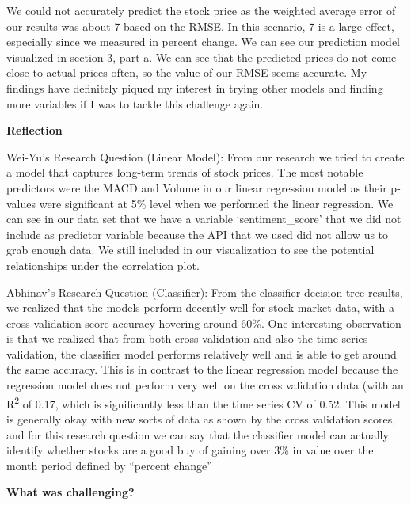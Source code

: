 \documentclass[
]{article}
\begin{document}
We could not accurately predict the stock price as the weighted average
error of our results was about 7 based on the RMSE. In this scenario, 7
is a large effect, especially since we measured in percent change. We
can see our prediction model visualized in section 3, part a. We can see
that the predicted prices do not come close to actual prices often, so
the value of our RMSE seems accurate. My findings have definitely piqued
my interest in trying other models and finding more variables if I was
to tackle this challenge again.

\textbf{Reflection}

Wei-Yu's Research Question (Linear Model): From our research we tried to
create a model that captures long-term trends of stock prices. The most
notable predictors were the MACD and Volume in our linear regression
model as their p-values were significant at 5\% level when we performed
the linear regression. We can see in our data set that we have a
variable `sentiment\_score' that we did not include as predictor
variable because the API that we used did not allow us to grab enough
data. We still included in our visualization to see the potential
relationships under the correlation plot.

Abhinav's Research Question (Classifier): From the classifier decision
tree results, we realized that the models perform decently well for
stock market data, with a cross validation score accuracy hovering
around 60\%. One interesting observation is that we realized that from
both cross validation and also the time series validation, the
classifier model performs relatively well and is able to get around the
same accuracy. This is in contrast to the linear regression model
because the regression model does not perform very well on the cross
validation data (with an R\textsuperscript{2} of 0.17, which is
significantly less than the time series CV of 0.52. This model is
generally okay with new sorts of data as shown by the cross validation
scores, and for this research question we can say that the classifier
model can actually identify whether stocks are a good buy of gaining
over 3\% in value over the month period defined by ``percent change''

\textbf{What was challenging?}
\end{document}
